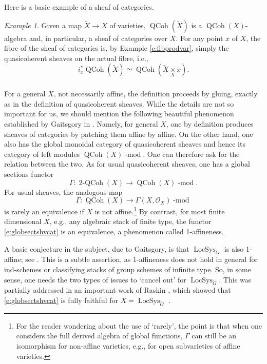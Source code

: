 \documentclass[10pt]{amsart}
\newcommand{\TwoCoh}{\on{2-QCoh}}
\newcommand{\LS}{\on{LocSys}_{\cG}}
\newcommand{\on}{\operatorname}
\renewcommand{\mod}{\on{-mod}}
\theoremstyle{remark}
\newtheorem{ex}[subsubsection]{Example}
\newcommand{\OO}{\mathscr{O}}
\numberwithin{equation}{section}
\newcommand{\cG}{\check{G}}
\renewcommand{\mod}{\operatorname{-mod}}
\newcommand{\QCoh}{\on{QCoh}}
\begin{document}
	
	
	
	
	
	Here is a basic example of a sheaf of categories. 
	
	\begin{ex}Given a map $\tilde{X} \rightarrow X$ of varieties,   
	$\QCoh(\tilde{X})$ is a $\QCoh(X)$-algebra and, in particular, a sheaf of categories over $X$. For any 
	point $x$ of $X$, the fibre of the sheaf of categories is, by Example 
	\ref{e:fibprodvar}, simply 
	the quasicoherent sheaves on the actual fibre, i.e., 
	\[
	  i_x^* \QCoh(\tilde{X}) \simeq \QCoh( \tilde{X} \underset X \times x).
	\]
	\end{ex}
	
	
	\subsubsection{} For a general $X$, not necessarily affine, the definition 
	proceeds by gluing, 
	exactly as in the definition of quasicoherent sheaves. While the details are not so important for us, we should mention the 
	following beautiful phenomenon established by Gaitsgory in \cite{1affine}. Namely, for general $X$, one by definition produces sheaves of categories by 
	patching them affine by affine. On the other hand, one also has the global 
	monoidal category of quasicoherent sheaves and hence its category of left 
	modules $\QCoh(X)\mod$. One can therefore ask for the relation between the two. As for usual 
	quasicoherent sheaves, one 
	has a 
	global sections functor 
	\begin{equation} \label{e:globsectshvcat}
	 \Gamma: \TwoCoh(X) \rightarrow \QCoh(X)\mod.
	\end{equation}
    For usual sheaves, the analogous map 
    \[
    \Gamma: \QCoh(X) \rightarrow \Gamma(X, \OO_X)\mod
    \]
	is rarely an equivalence if $X$ is not affine.\footnote{For the reader 
	wondering about the use of `rarely', the point is that when one considers 
	the full 
	derived algebra of global functions, $\Gamma$ can still be an isomorphism 
	for non-affine varieties, e.g., for open subvarieties of affine varieties.}
	By contrast, for most finite dimensional $X$, e.g., any algebraic stack of 
	finite type, the functor \eqref{e:globsectshvcat} is an {equivalence}, a 
	phenomenon called 1-affineness. 
	
	
	A basic conjecture in the subject, due to Gaitsgory, is that $\LS$ is also 
	1-affine; see \cite{raskinspectraldecomp}. This is a subtle assertion, as 1-affineness does not hold in
	general for ind-schemes or classifying stacks of group schemes of infinite 
	type. So, in some sense, one needs the two types of issues to `cancel 
	out' for $\LS$. This was partially addressed in an 
	important work of Raskin \cite{raskinspectraldecomp}, which 
	showed that 
	\eqref{e:globsectshvcat} is fully faithful for $X = \LS$ . 
	
\end{document}

